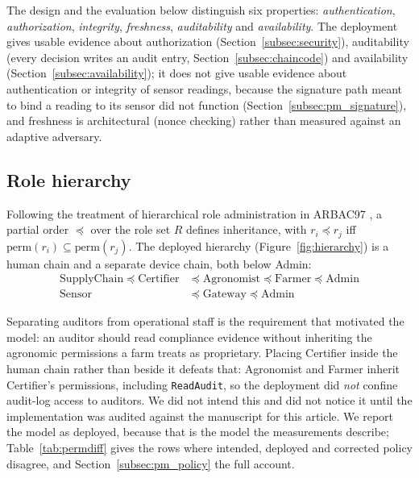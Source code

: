 \documentclass[a4paper,fleqn]{cas-sc}
\begin{document}
The design and the evaluation below distinguish six properties:
\emph{authentication}, \emph{authorization}, \emph{integrity},
\emph{freshness}, \emph{auditability} and \emph{availability}. The
deployment gives usable evidence about authorization
(Section~\ref{subsec:security}), auditability (every decision writes an
audit entry, Section~\ref{subsec:chaincode}) and availability
(Section~\ref{subsec:availability}); it does not give usable evidence about
authentication or integrity of sensor readings, because the signature path
meant to bind a reading to its sensor did not function
(Section~\ref{subsec:pm_signature}), and freshness is architectural (nonce
checking) rather than measured against an adaptive adversary.

\subsection{Role hierarchy}
\label{subsec:roles}

Following the treatment of hierarchical role administration in ARBAC97
\cite{sandhu1999arbac97}, a partial order $\preceq$ over the role set $R$
defines inheritance, with $r_i \preceq r_j$ iff
$\mathrm{perm}(r_i) \subseteq \mathrm{perm}(r_j)$. The deployed hierarchy
(Figure~\ref{fig:hierarchy}) is a human chain and a separate device chain,
both below Admin:
\begin{align}
\mathrm{SupplyChain} \preceq \mathrm{Certifier} &\preceq
  \mathrm{Agronomist} \preceq \mathrm{Farmer} \preceq \mathrm{Admin}
  \label{eq:human}\\
\mathrm{Sensor} &\preceq \mathrm{Gateway} \preceq \mathrm{Admin}
  \label{eq:device}
\end{align}

Separating auditors from operational staff is the requirement that motivated
the model: an auditor should read compliance evidence without inheriting the
agronomic permissions a farm treats as proprietary. Placing Certifier inside
the human chain rather than beside it defeats that: Agronomist and Farmer
inherit Certifier's permissions, including \texttt{ReadAudit}, so the
deployment did \emph{not} confine audit-log access to auditors. We did not
intend this and did not notice it until the implementation was audited
against the manuscript for this article. We report the model as deployed,
because that is the model the measurements describe; Table~\ref{tab:permdiff}
gives the rows where intended, deployed and corrected policy disagree, and
Section~\ref{subsec:pm_policy} the full account.
\end{document}
